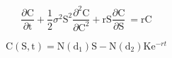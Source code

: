 \documentclass{article}
\begin{document}
\begin{equation}
\frac{\partial \mathrm C}{ \partial \mathrm t } + \frac{1}{2}\sigma^{2} \mathrm S^{2} \frac{\partial^{2} \mathrm C}{\partial \mathrm C^2}
+ \mathrm r \mathrm S \frac{\partial \mathrm C}{\partial \mathrm S}\ =
\mathrm r \mathrm C
\label{eq:1}
\end{equation}

\begin{equation}
    \mathrm C(\mathrm S,\mathrm t)= \mathrm N(\mathrm d_1)\mathrm S - \mathrm N(\mathrm d_2) \mathrm K \mathrm e^{-rt}
    \label{eq:2}
\end{equation}
\end{document}
